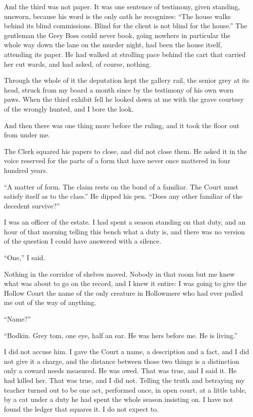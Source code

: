 And the third was not paper. It was one sentence of testimony, given standing, unsworn, because his word is the only oath he recognizes: ``The house walks behind its blind commissions. Blind for the client is not blind for the house.'' The gentleman the Grey Boss could never book, going nowhere in particular the whole way down the lane on the murder night, had been the house itself, attending its paper. He had walked at strolling pace behind the cart that carried her cut wards, and had asked, of course, nothing.

Through the whole of it the deputation kept the gallery rail, the senior grey at its head, struck from my board a month since by the testimony of his own worn paws. When the third exhibit fell he looked down at me with the grave courtesy of the wrongly hunted, and I bore the look.

And then there was one thing more before the ruling, and it took the floor out from under me.

The Clerk squared his papers to close, and did not close them. He asked it in the voice reserved for the parts of a form that have never once mattered in four hundred years.

``A matter of form. The claim rests on the bond of a familiar. The Court must satisfy itself as to the class.'' He dipped his pen. ``Does any other familiar of the decedent survive?''

I was an officer of the estate. I had spent a season standing on that duty, and an hour of that morning telling this bench what a duty is, and there was no version of the question I could have answered with a silence.

``One,'' I said.

Nothing in the corridor of shelves moved. Nobody in that room but me knew what was about to go on the record, and I knew it entire: I was going to give the Hollow Court the name of the only creature in Hollowmere who had ever pulled me out of the way of anything.

``Name?''

``Bodkin. Grey tom, one eye, half an ear. He was hers before me. He is living.''

I did not accuse him. I gave the Court a name, a description and a fact, and I did not give it a charge, and the distance between those two things is a distinction only a coward needs measured. He was owed. That was true, and I said it. He had killed her. That was true, and I did not. Telling the truth and betraying my teacher turned out to be one act, performed once, in open court, at a little table, by a cat under a duty he had spent the whole season insisting on. I have not found the ledger that squares it. I do not expect to.

